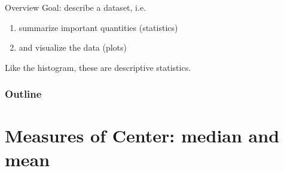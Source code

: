 %
%
%



\subtitle{means, medians, and plots}

\date{20 January 2015}




\begin{frame}
  \maketitle
\end{frame}




\begin{frame}{Overview}
    Goal: describe a dataset, i.e.
    \begin{enumerate}
        \item summarize important quantities (statistics)
        \item and visualize the data (plots)
    \end{enumerate}

    \vspace{3em}

    Like the histogram,
    these are \alert{descriptive statistics}.
\end{frame}


\begin{frame}\frametitle<presentation>{Outline}
  \tableofcontents
\end{frame}


\section{Measures of Center: median and mean}


